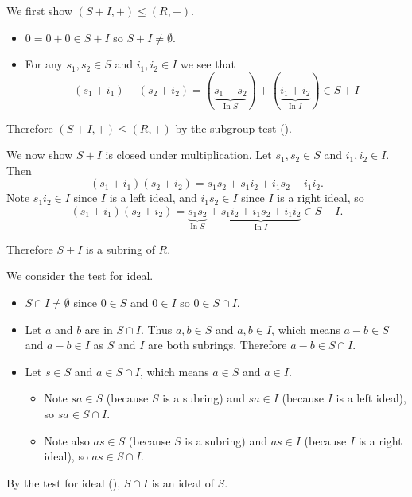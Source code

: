 \begin{questions}
    \item \begin{partquestions}{\roman*}
        \item We first show $(S+I, +) \leq (R,+)$.
        \begin{itemize}
            \item $0 = 0 + 0 \in S + I$ so $S + I \neq \emptyset$.
            \item For any $s_1, s_2 \in S$ and $i_1, i_2 \in I$ we see that
            \[
                (s_1+i_1) - (s_2 + i_2) = (\underbrace{s_1 - s_2}_{\text{In }S}) + (\underbrace{i_1 + i_2}_{\text{In }I}) \in S + I
            \]
        \end{itemize}
        Therefore $(S+I, +) \leq (R,+)$ by the subgroup test ().

        We now show $S+I$ is closed under multiplication. Let $s_1, s_2 \in S$ and $i_1, i_2 \in I$. Then
        \[
            (s_1 + i_1)(s_2 + i_2) = s_1s_2 + s_1i_2 + i_1s_2 + i_1i_2.
        \]
        Note $s_1i_2 \in I$ since $I$ is a left ideal, and $i_1s_2 \in I$ since $I$ is a right ideal, so
        \[
            (s_1 + i_1)(s_2 + i_2) = \underbrace{s_1s_2}_{\text{In }S} + \underbrace{s_1i_2 + i_1s_2 + i_1i_2}_{\text{In }I} \in S + I.
        \]

        Therefore $S+I$ is a subring of $R$.

        \item We consider the test for ideal.
        \begin{itemize}
            \item $S \cap I \neq \emptyset$ since $0 \in S$ and $0 \in I$ so $0 \in S \cap I$.
            \item Let $a$ and $b$ are in $S \cap I$. Thus $a, b \in S$ and $a, b \in I$, which means $a - b \in S$ and $a - b \in I$ as $S$ and $I$ are both subrings. Therefore $a - b \in S \cap I$.
            \item Let $s \in S$ and $a \in S \cap I$, which means $a \in S$ and $a \in I$.
            \begin{itemize}
                \item Note $sa \in S$ (because $S$ is a subring) and $sa \in I$ (because $I$ is a left ideal), so $sa \in S \cap I$.
                \item Note also $as \in S$ (because $S$ is a subring) and $as \in I$ (because $I$ is a right ideal), so $as \in S \cap I$.
            \end{itemize}
        \end{itemize}
        By the test for ideal (), $S \cap I$ is an ideal of $S$.


\end{partquestions}
\end{questions}
